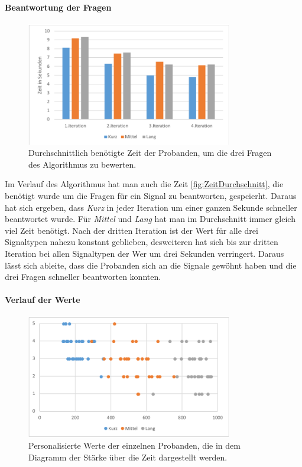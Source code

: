 \paragraph{Beantwortung der Fragen}
\begin{figure}[htbp] 
            \centering
   	\includegraphics[width=0.8\textwidth]{pics/analyse/algo/ZeitDurchschnitt.png}
	\caption{Durchschnittlich ben{\"o}tigte Zeit der Probanden, um die drei Fragen des Algorithmus zu bewerten.}
	\label{fig:ZeitDurchschnitt}
\end{figure}
Im Verlauf des Algorithmus hat man auch die Zeit \autoref{fig:ZeitDurchschnitt}, die ben{\"o}tigt wurde um die Fragen f{\"u}r ein Signal zu beantworten, gespcierht. 
Daraus hat sich ergeben, dass \textit{Kurz} in jeder Iteration um einer ganzen Sekunde schneller beantwortet wurde. 
F{\"u}r \textit{Mittel} und \textit{Lang} hat man im Durchschnitt immer gleich viel Zeit ben{\"o}tigt.
Nach der dritten Iteration ist der Wert f{\"u}r alle drei Signaltypen nahezu konstant geblieben, desweiteren hat sich bis zur dritten Iteration bei allen Signaltypen der Wer um drei Sekunden verringert. 
Daraus l{\"a}sst sich ableite, dass die Probanden sich an die Signale gew{\"o}hnt haben und die drei Fragen schneller beantworten konnten.

\paragraph{Verlauf der Werte}
\begin{figure}[htbp] 
            \centering
   	\includegraphics[width=0.8\textwidth]{pics/analyse/algo/ergebnisnachAlgo.png}
	\caption{Personalisierte Werte der einzelnen Probanden, die in dem Diagramm der St{\"a}rke {\"u}ber die Zeit dargestellt werden.}
	\label{fig:ergebnisNachAlgo}
\end{figure}

